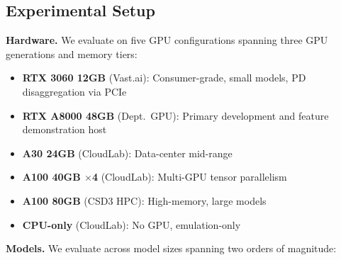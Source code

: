 \documentclass[conference]{IEEEtran}
\begin{document}
\subsection{Experimental Setup}

\textbf{Hardware.} We evaluate on five GPU configurations spanning three GPU generations and memory tiers:

\begin{itemize}
\item \textbf{RTX 3060 12GB} (Vast.ai): Consumer-grade, small models, PD disaggregation via PCIe
\item \textbf{RTX A8000 48GB} (Dept.\ GPU): Primary development and feature demonstration host
\item \textbf{A30 24GB} (CloudLab): Data-center mid-range
\item \textbf{A100 40GB $\times$4} (CloudLab): Multi-GPU tensor parallelism
\item \textbf{A100 80GB} (CSD3 HPC): High-memory, large models
\item \textbf{CPU-only} (CloudLab): No GPU, emulation-only
\end{itemize}

\textbf{Models.} We evaluate across model sizes spanning two orders of magnitude:

\begin{table}[t!]
\centering
\caption{Evaluation configurations. $\star$ = primary config.}
\label{tab:matrix}
\footnotesize
{}
\end{table}
\end{document}
